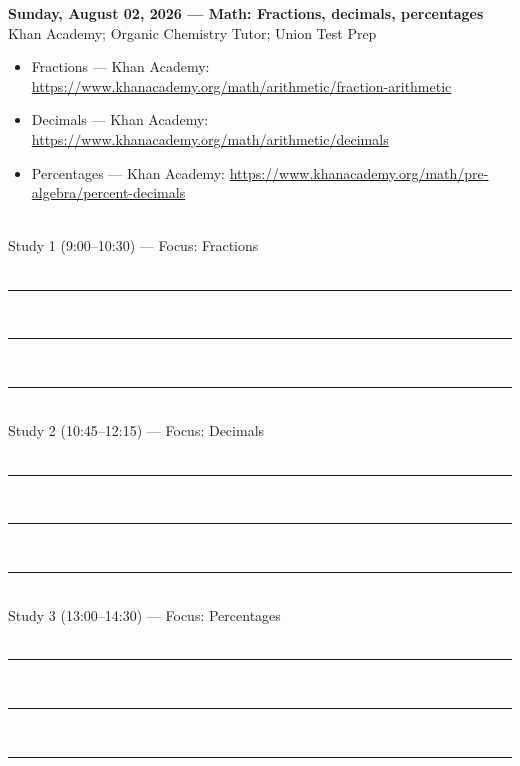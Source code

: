 \documentclass[11pt,a4paper]{article}
\begin{document}
{\large \textbf{Sunday, August 02, 2026 — Math: Fractions, decimals, percentages}}\\[6pt]
 Khan Academy; Organic Chemistry Tutor; Union Test Prep\\[6pt]
\begin{itemize}
  \item Fractions — Khan Academy: \url{https://www.khanacademy.org/math/arithmetic/fraction-arithmetic}
  \item Decimals — Khan Academy: \url{https://www.khanacademy.org/math/arithmetic/decimals}
  \item Percentages — Khan Academy: \url{https://www.khanacademy.org/math/pre-algebra/percent-decimals}
\end{itemize}
\vspace{4mm}
\\
Study 1 (9:00–10:30) — Focus: Fractions\\
\vspace{2mm}
\\[2pt]
\rule{\linewidth}{0.5pt}\\[2pt]
\rule{\linewidth}{0.5pt}\\[2pt]
\rule{\linewidth}{0.5pt}\\[6pt]
Study 2 (10:45–12:15) — Focus: Decimals\\
\vspace{2mm}
\\[2pt]
\rule{\linewidth}{0.5pt}\\[2pt]
\rule{\linewidth}{0.5pt}\\[2pt]
\rule{\linewidth}{0.5pt}\\[6pt]
Study 3 (13:00–14:30) — Focus: Percentages\\
\vspace{2mm}
\\[2pt]
\rule{\linewidth}{0.5pt}\\[2pt]
\rule{\linewidth}{0.5pt}\\[2pt]
\rule{\linewidth}{0.5pt}
\newpage
\end{document}
